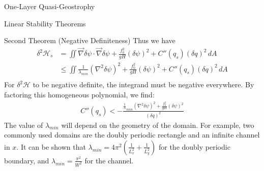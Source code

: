 \documentclass[12pt]{article}
\begin{document}
\begin{section}{One-Layer Quasi-Geostrophy}
\begin{subsection}{Linear Stability Theorems}
\begin{subsubsection}{Second Theorem (Negative Definiteness)}
            Thus we have
            \begin{align*}
                \delta^2\mathcal{H}_s
                &= \iint \vec\nabla \delta \psi \cdot \vec \nabla \delta \psi + \frac{f_0^2}{gH} (\delta \psi)^2+  C''(q_s) (\delta q)^2  \, dA \\
                &\le \iint \frac{1}{\lambda_{min}}(\nabla^2\delta\psi)^2 + \frac{f_0^2}{gH} (\delta \psi)^2+  C''(q_s) (\delta q)^2  \, dA \\
            \end{align*}
            For $\delta^2\mathcal{H}$ to be negative definite, the integrand must be negative everywhere. By factoring this homogeneous polynomial, we find:
            \begin{align*}
                C''(q_s) < -\frac{\frac1\lambda_{min}(\nabla^2\delta\psi)^2 + \frac{f_0^2}{gH}(\delta\psi)^2}{(\delta q)^2}
            \end{align*}
            The value of $\lambda_{min}$ will depend on the geometry of the domain. For example, two commonly used domains are the doubly periodic rectangle and an infinite channel in $x$.
            It can be shown that $\lambda_{min} = 4\pi^2(\frac1{L_x^2} + \frac1{L_y^2})$ for the doubly periodic boundary, and $\lambda_{min} = \frac{\pi^2}{W^2}$ for the channel.
        \end{subsubsection}
    \end{subsection}


\end{section}
\end{document}
